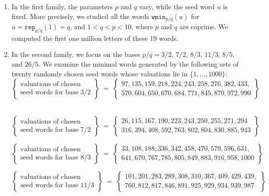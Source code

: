 \documentclass{template_arxiv}
\numberwithin{equation}{section}
\newcommand{\wmin}{\mathtt{wmin}}
\newcommand{\rep}{\mathtt{rep}}
\begin{document}
\begin{enumerate}
\item In the first family, the parameters $p$ and $q$ vary, while the seed word $u$ is fixed. More precisely, we studied all the words $\wmin_{p/q}(u)$ for $u=\rep_{p/q}(1) =q$, and $1<q<p<10$, where $p$ and $q$ are coprime. We computed the first one million letters of these 19 words.



\item In the second family, we focus on the bases $p/q = 3/2$, $7/2$, $8/3$, $11/3$, $8/5$, and $26/5$. We examine the minimal words generated by the following sets of twenty randomly chosen seed words whose valuations lie in $\{1,\ldots,1000\}$: \small
\[
    \left\{\begin{array}{c} \text{valuations of chosen} \\ \text{seed words for base $3/2$}\end{array}\right\} \;=\; \left\{\begin{array}{c} 97, 135, 159, 218, 224, 243, 258, 276, 382, 433, \\ 570, 604, 650, 670, 684, 771, 845, 870, 972, 990 \end{array}\right\}
\]

\textcolor{white}{.}
\vspace{-0.7cm}
\[
    \left\{\begin{array}{c} \text{valuations of chosen} \\ \text{seed words for base $7/2$}\end{array}\right\} \;=\; \left\{\begin{array}{c} 26, 115, 167, 190, 223, 243, 250, 255, 271, 294 \\ 316, 394, 408, 592, 763, 802, 804, 830, 885, 943 \end{array}\right\}
\]

\vspace{-0.5cm}
\[
    \left\{\begin{array}{c} \text{valuations of chosen} \\ \text{seed words for base $8/3$}\end{array}\right\} \;=\; \left\{\begin{array}{c} 33,108,188,336,342,458,470,579,596,631, \\ 641,670,767,785,805,849,883,916,958,1000 \end{array}\right\}
\]

\vspace{-0.5cm}
\[
\left\{\begin{array}{c} \text{valuations of chosen} \\ \text{seed words for base $11/3$}\end{array}\right\} \;=\; \left\{\begin{array}{c}  101, 201, 283, 289, 308, 310, 367, 409, 429, 439, \\ 760, 812, 817, 846, 891, 925, 929, 934, 939, 987 \end{array}\right\}
\]




\end{enumerate}
\end{document}
